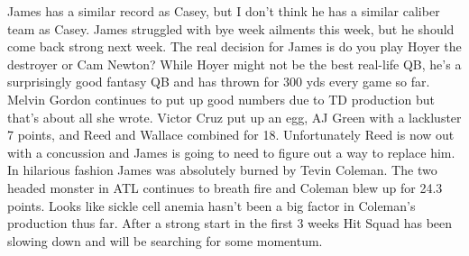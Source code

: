 \documentclass[11pt,letterpaper]{article}
\begin{document}
\par\noindent James has a similar record as Casey, but I don't think he has a similar caliber team as Casey. James struggled with bye week ailments this week, but he should come back strong next week. The real decision for James is do you play Hoyer the destroyer or Cam Newton? While Hoyer might not be the best real-life QB, he's a surprisingly good fantasy QB and has thrown for 300 yds every game so far. Melvin Gordon continues to put up good numbers due to TD production  but that's about all she wrote. Victor Cruz put up an egg, AJ Green with a lackluster 7 points, and Reed and Wallace combined for 18. Unfortunately Reed is now out with a concussion and James is going to need to figure out a way to replace him. In hilarious fashion James was absolutely burned by Tevin Coleman.  The two headed monster in ATL continues to breath fire and Coleman blew up for 24.3 points. Looks like sickle cell anemia hasn't been a big factor in Coleman's production thus far. After a strong start in the first 3 weeks Hit Squad has been slowing down and will be searching for some momentum.  
\end{document}

